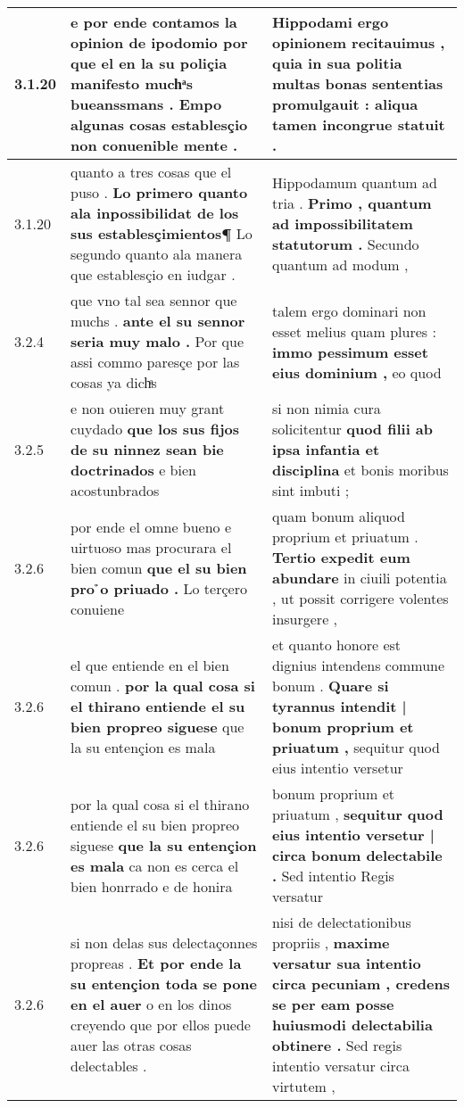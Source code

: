 \begin{tabular}{|p{1cm}|p{6.5cm}|p{6.5cm}|}
3.1.20 & e por ende contamos la opinion de ipodomio \textbf{ por que el en la su poliçia manifesto muchͣs bueanssmans . } Empo algunas cosas establesçio non conuenible mente . & Hippodami ergo opinionem recitauimus , \textbf{ quia in sua politia multas bonas sententias promulgauit : } aliqua tamen incongrue statuit . \\\hline
3.1.20 & quanto a tres cosas que el puso . \textbf{ Lo primero quanto ala inpossibilidat de los sus establesçimientos¶ } Lo segundo quanto ala manera que establesçio en iudgar . & Hippodamum quantum ad tria . \textbf{ Primo , quantum ad impossibilitatem statutorum . } Secundo quantum ad modum , \\\hline
3.2.4 & que vno tal sea sennor que muchs . \textbf{ ante el su sennor seria muy malo . } Por que assi commo paresçe por las cosas ya dichͣs & talem ergo dominari non esset melius quam plures : \textbf{ immo pessimum esset eius dominium , } eo quod \\\hline
3.2.5 & e non ouieren muy grant cuydado \textbf{ que los sus fijos de su ninnez sean bie doctrinados } e bien acostunbrados & si non nimia cura solicitentur \textbf{ quod filii ab ipsa infantia et disciplina } et bonis moribus sint imbuti ; \\\hline
3.2.6 & por ende el omne bueno e uirtuoso mas procurara el bien comun \textbf{ que el su bien pro ̉o priuado . } Lo terçero conuiene & quam bonum aliquod proprium et priuatum . \textbf{ Tertio expedit eum abundare } in ciuili potentia , ut possit corrigere volentes insurgere , \\\hline
3.2.6 & el que entiende en el bien comun . \textbf{ por la qual cosa si el thirano entiende el su bien propreo siguese } que la su entençion es mala & et quanto honore est dignius intendens commune bonum . \textbf{ Quare si tyrannus intendit | bonum proprium et priuatum , } sequitur quod eius intentio versetur \\\hline
3.2.6 & por la qual cosa si el thirano entiende el su bien propreo siguese \textbf{ que la su entençion es mala } ca non es cerca el bien honrrado e de honira & bonum proprium et priuatum , \textbf{ sequitur quod eius intentio versetur | circa bonum delectabile . } Sed intentio Regis versatur \\\hline
3.2.6 & si non delas sus delectaçonnes propreas . \textbf{ Et por ende la su entençion toda se pone en el auer } o en los dinos creyendo que por ellos puede auer las otras cosas delectables . & nisi de delectationibus propriis , \textbf{ maxime versatur sua intentio circa pecuniam , credens se per eam posse huiusmodi delectabilia obtinere . } Sed regis intentio versatur circa virtutem , \\\hline

\end{tabular}
